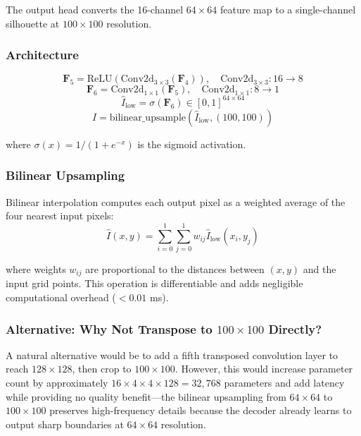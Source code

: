 \documentclass[12pt,a4paper,oneside]{report}
\begin{document}
The output head converts the 16-channel $64 \times 64$ feature map to a single-channel silhouette at $100 \times 100$ resolution.

\subsubsection{Architecture}
\label{subsubsec:architecture}

\begin{equation}
\mathbf{F}_5 = \text{ReLU}(\text{Conv2d}_{3\times3}(\mathbf{F}_4)), \quad \text{Conv2d}_{3\times3}: 16 \rightarrow 8
\end{equation}
\begin{equation}
\mathbf{F}_6 = \text{Conv2d}_{1\times1}(\mathbf{F}_5), \quad \text{Conv2d}_{1\times1}: 8 \rightarrow 1
\end{equation}
\begin{equation}
\hat{I}_{\text{low}} = \sigma(\mathbf{F}_6) \in [0, 1]^{64 \times 64}
\end{equation}
\begin{equation}
\hat{I} = \text{bilinear\_upsample}(\hat{I}_{\text{low}}, (100, 100))
\end{equation}

where $\sigma(x) = 1/(1 + e^{-x})$ is the sigmoid activation.

\subsubsection{Bilinear Upsampling}
\label{subsubsec:bilinear_upsampling}

Bilinear interpolation computes each output pixel as a weighted average of the four nearest input pixels:
\begin{equation}
\hat{I}(x,y) = \sum_{i=0}^{1}\sum_{j=0}^{1} w_{ij} \hat{I}_{\text{low}}(x_i, y_j)
\end{equation}

where weights $w_{ij}$ are proportional to the distances between $(x,y)$ and the input grid points. This operation is differentiable and adds negligible computational overhead ($<0.01$ ms).

\subsubsection{Alternative: Why Not Transpose to $100 \times 100$ Directly?}
\label{subsubsec:alternative_why_not_transpose_to_100_times_100_directly}

A natural alternative would be to add a fifth transposed convolution layer to reach $128 \times 128$, then crop to $100 \times 100$. However, this would increase parameter count by approximately $16 \times 4 \times 4 \times 128 = 32,768$ parameters and add latency while providing no quality benefit—the bilinear upsampling from $64 \times 64$ to $100 \times 100$ preserves high-frequency details because the decoder already learns to output sharp boundaries at $64 \times 64$ resolution.
\end{document}
